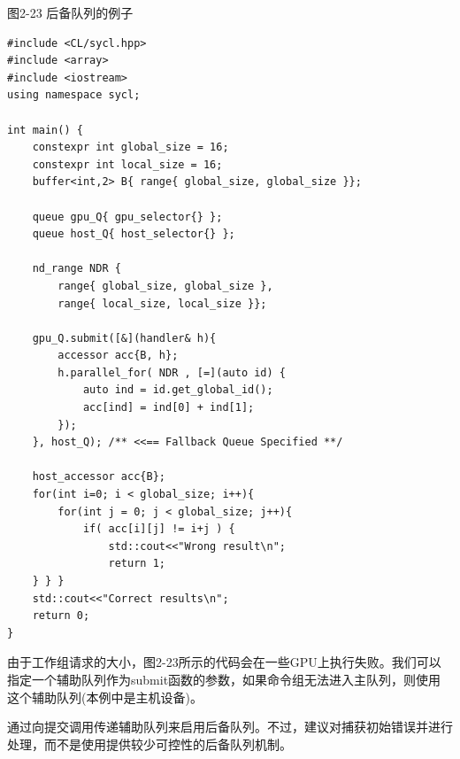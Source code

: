 \hspace*{\fill} \par %
图2-23 后备队列的例子
\begin{lstlisting}[caption={}]
#include <CL/sycl.hpp>
#include <array>
#include <iostream>
using namespace sycl;

int main() {
	constexpr int global_size = 16;
	constexpr int local_size = 16;
	buffer<int,2> B{ range{ global_size, global_size }};
	
	queue gpu_Q{ gpu_selector{} };
	queue host_Q{ host_selector{} };
	
	nd_range NDR {
		range{ global_size, global_size },
		range{ local_size, local_size }};
	
	gpu_Q.submit([&](handler& h){
		accessor acc{B, h};
		h.parallel_for( NDR , [=](auto id) {
			auto ind = id.get_global_id();
			acc[ind] = ind[0] + ind[1];
		});
	}, host_Q); /** <<== Fallback Queue Specified **/

	host_accessor acc{B};
	for(int i=0; i < global_size; i++){
		for(int j = 0; j < global_size; j++){
			if( acc[i][j] != i+j ) {
				std::cout<<"Wrong result\n";
				return 1;
	} } }
	std::cout<<"Correct results\n";
	return 0;
}
\end{lstlisting}

由于工作组请求的大小，图2-23所示的代码会在一些GPU上执行失败。我们可以指定一个辅助队列作为submit函数的参数，如果命令组无法进入主队列，则使用这个辅助队列(本例中是主机设备)。\par

\begin{tcolorbox}[colback=red!5!white,colframe=red!75!black]
通过向提交调用传递辅助队列来启用后备队列。不过，建议对捕获初始错误并进行处理，而不是使用提供较少可控性的后备队列机制。
\end{tcolorbox}
